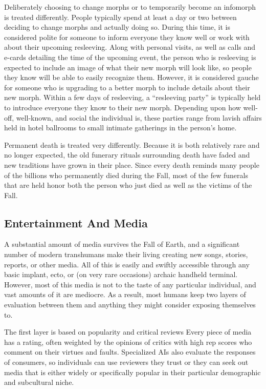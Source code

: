 Deliberately choosing to change morphs or to temporarily
become an infomorph is treated differently.
People typically spend at least a day or two between 
deciding to change morphs and actually doing so. 
During this time, it is considered polite for someone 
to inform everyone they know well or work with 
about their upcoming resleeving. Along with personal 
visits, as well as calls and e-cards detailing the time 
of the upcoming event, the person who is resleeving 
is expected to include an image of what their new 
morph will look like, so people they know will be 
able to easily recognize them. However, it is considered
gauche for someone who is upgrading to a better
morph to include details about their new morph. 
Within a few days of resleeving, a ``resleeving party'' 
is typically held to introduce everyone they know 
to their new morph. Depending upon how well-off, 
well-known, and social the individual is, these parties 
range from lavish affairs held in hotel ballrooms to 
small intimate gatherings in the person's home.

Permanent death is treated very differently. Because 
it is both relatively rare and no longer expected, the 
old funerary rituals surrounding death have faded 
and new traditions have grown in their place. Since 
every death reminds many people of the billions who 
permanently died during the Fall, most of the few 
funerals that are held honor both the person who just 
died as well as the victims of the Fall.

\subsection{Entertainment And Media}

A substantial amount of media survives the Fall of 
Earth, and a significant number of modern transhumans
make their living creating new songs, stories,
reports, or other media. All of this is easily and swiftly 
accessible through any basic implant, ecto, or (on very 
rare occasions) archaic handheld terminal. However, 
most of this media is not to the taste of any particular 
individual, and vast amounts of it are mediocre. As 
a result, most humans keep two layers of evaluation 
between them and anything they might consider exposing
themselves to.

The first layer is based on popularity and critical reviews
Every piece of media has a rating, often weighted
by the opinions of critics with high rep scores who
comment on their virtues and faults. Specialized AIs 
also evaluate the responses of consumers, so individuals
can use reviewers they trust or they can seek out
media that is either widely or specifically popular in 
their particular demographic and subcultural niche.

